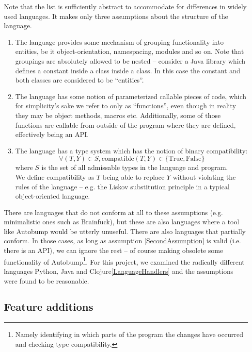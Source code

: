 \documentclass{l4proj}
\begin{document}
Note that the list is sufficiently abstract to accommodate for
differences in widely used languages. It makes only three assumptions
about the structure of the language.

\begin{enumerate}
\item The language provides some mechanism of grouping functionality
into entities, be it object-orientation, namespacing, modules and so
on. Note that groupings are absolutely allowed to be nested --
consider a Java library which defines a constant inside a class inside
a class. In this case the constant and both classes are considered to
be ``entities''.
\item The language has some notion of parameterized callable pieces of
code, which for simplicity's sake we refer to only as ``functions'',
even though in reality they may be object methods, macros etc.
Additionally, some of those functions are callable from outside
of the program where they are defined, effectively being an API.
\label{SecondAssumption}
\item The language has a type system which has the notion of binary
compatibility:
\begin{equation}
\forall(T,Y) \in S, \mathrm{compatible}(T,Y) \in \{\mathrm{True},\mathrm{False}\}
\end{equation}
where $S$ is the set of all admissable types in the language and
program. \\

We define compatibility as $T$ being able to replace $Y$
without violating the rules of the language -- e.g. the Liskov
substitution principle\cite{Liskov} in a typical object-oriented
language.
\end{enumerate}

There are languages that do not conform at all to these assumptions
(e.g. minimalistic ones such as Brainfuck\cite{Brainfuck}), but these
are also languages where a tool like Autobump would be utterly
unuseful. There are also languages that partially conform. In those
cases, as long as assumption \ref{SecondAssumption} is valid (i.e.
there is an API), we can ignore the rest -- of course making obsolete
some functionality of Autobump\footnote{Namely identifying in which
parts of the program the changes have occurred and checking type
compatibility.}. For this project, we examined the radically
different languages Python, Java and Clojure\ref{LanguageHandlers} and
the assumptions were found to be reasonable.

\subsection{Feature additions}
\end{document}
